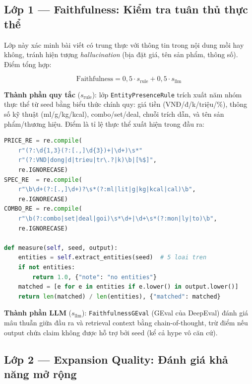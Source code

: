 \subsection{Lớp 1 --- Faithfulness: Kiểm tra tuân thủ thực thể}
\label{subsec:faithfulness}

Lớp này xác minh bài viết có trung thực với thông tin trong nội dung
mồi hay không, tránh hiện tượng \emph{hallucination} (bịa đặt giá,
tên sản phẩm, thông số). Điểm tổng hợp:

\begin{equation}
  \text{Faithfulness} = 0{,}5 \cdot s_{\text{rule}} + 0{,}5 \cdot s_{\text{llm}}
  \label{eq:faithfulness}
\end{equation}

\textbf{Thành phần quy tắc} ($s_{\text{rule}}$): lớp
\texttt{EntityPresenceRule} trích xuất năm nhóm thực thể từ seed
bằng biểu thức chính quy: giá tiền (VNĐ/đ/k/triệu/\%), thông số kỹ
thuật (ml/g/kg/kcal), combo/set/deal, chuỗi trích dẫn, và tên sản
phẩm/thương hiệu. Điểm là tỉ lệ thực thể xuất hiện trong đầu ra:

\begin{lstlisting}[language=Python, caption={EntityPresenceRule --- năm nhóm thực thể F\&B.}]
PRICE_RE = re.compile(
    r"(?:\d{1,3}(?:[.,]\d{3})+|\d+)\s*"
    r"(?:VND|dong|d|trieu|tr\.?|k)\b|[%$]",
    re.IGNORECASE)
SPEC_RE  = re.compile(
    r"\b\d+(?:[.,]\d+)?\s*(?:ml|lit|g|kg|kcal|cal)\b",
    re.IGNORECASE)
COMBO_RE = re.compile(
    r"\b(?:combo|set|deal|goi)\s*\d+|\d+\s*(?:mon|ly|to)\b",
    re.IGNORECASE)

def measure(self, seed, output):
    entities = self.extract_entities(seed)  # 5 loai tren
    if not entities:
        return 1.0, {"note": "no entities"}
    matched = [e for e in entities if e.lower() in output.lower()]
    return len(matched) / len(entities), {"matched": matched}
\end{lstlisting}

\textbf{Thành phần LLM} ($s_{\text{llm}}$): \texttt{FaithfulnessGEval}
(GEval  của DeepEval) đánh giá mâu thuẫn giữa đầu ra và retrieval
context bằng chain-of-thought, trừ điểm nếu output chứa claim không
được hỗ trợ bởi seed (kể cả hype vô căn cứ).

\subsection{Lớp 2 --- Expansion Quality: Đánh giá khả năng mở rộng}
\label{subsec:expansion}


